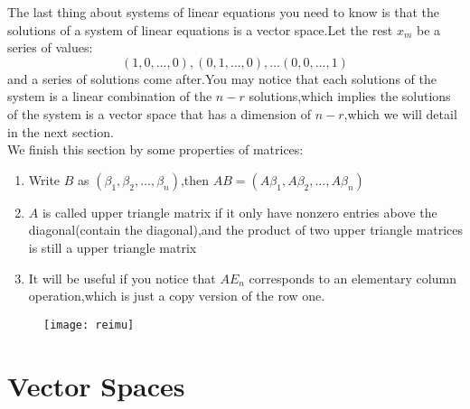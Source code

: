 \documentclass{article}
\begin{document}
\indent The last thing about systems of linear equations you need to know is that the solutions of a system of linear equations is a vector space.Let the rest $x_m$ be a series of values:\[(1,0,\dots,0),(0,1,\dots,0),\dots(0,0,\dots,1)\]and a series of solutions come after.You may notice that each solutions of the system is a linear combination of the $n-r$ solutions,which implies the solutions of the system is a vector space that has a dimension of $n-r$,which we will detail in the next section.\\
\indent We finish this section by some properties of matrices:
\begin{thm}
	\begin{enumerate}
		\item Write $B$ as $(\beta_1,\beta_2,\dots,\beta_n)$,then $AB=(A\beta_1,A\beta_2,\dots,A\beta_n)$
		\item $A$ is called upper triangle matrix if it only have nonzero entries above the diagonal(contain the diagonal),and the product of two upper triangle matrices is still a upper triangle matrix
		\item It will be useful if you notice that $AE_n$ corresponds to an elementary column operation,which is just a copy version of the row one. 
	\end{enumerate}
\end{thm}
\begin{figure}[htbp]
	\centering
	\texttt{[image: reimu]}
\end{figure}
\newpage
\section{Vector Spaces}\label{2}
\end{document}
